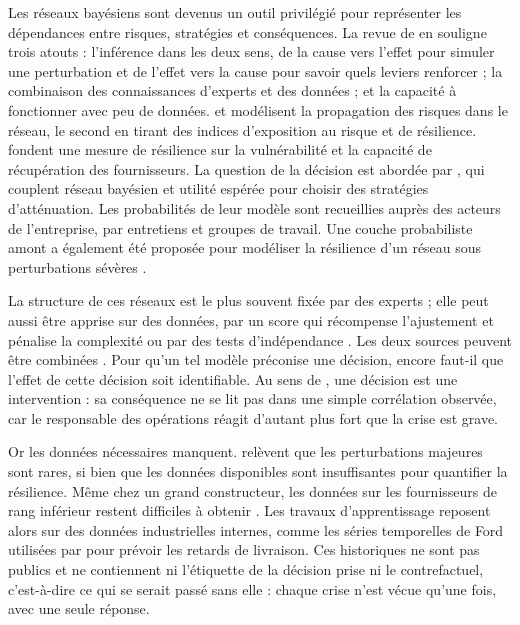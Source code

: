 Les réseaux bayésiens sont devenus un outil privilégié pour représenter les dépendances entre risques, stratégies et conséquences. La revue de \citet{hosseiniivanov2020} en souligne trois atouts : l'inférence dans les deux sens, de la cause vers l'effet pour simuler une perturbation et de l'effet vers la cause pour savoir quels leviers renforcer ; la combinaison des connaissances d'experts et des données ; et la capacité à fonctionner avec peu de données. \citet{garvey2015} et \citet{ojha2018} modélisent la propagation des risques dans le réseau, le second en tirant des indices d'exposition au risque et de résilience. \citet{hosseiniivanov2022aor} fondent une mesure de résilience sur la vulnérabilité et la capacité de récupération des fournisseurs. La question de la décision est abordée par \citet{qazi2018}, qui couplent réseau bayésien et utilité espérée pour choisir des stratégies d'atténuation. Les probabilités de leur modèle sont recueillies auprès des acteurs de l'entreprise, par entretiens et groupes de travail. Une couche probabiliste amont a également été proposée pour modéliser la résilience d'un réseau sous perturbations sévères \citep{rahiel2026codit}.

La structure de ces réseaux est le plus souvent fixée par des experts ; elle peut aussi être apprise sur des données, par un score qui récompense l'ajustement et pénalise la complexité ou par des tests d'indépendance \citep{koller2009, hosseiniivanov2020}. Les deux sources peuvent être combinées \citep{heckerman1995}. Pour qu'un tel modèle préconise une décision, encore faut-il que l'effet de cette décision soit identifiable. Au sens de \citet{pearl2009}, une décision est une intervention : sa conséquence ne se lit pas dans une simple corrélation observée, car le responsable des opérations réagit d'autant plus fort que la crise est grave.

Or les données nécessaires manquent. \citet{hosseiniivanov2020} relèvent que les perturbations majeures sont rares, si bien que les données disponibles sont insuffisantes pour quantifier la résilience. Même chez un grand constructeur, les données sur les fournisseurs de rang inférieur restent difficiles à obtenir \citep{simchilevi2015}. Les travaux d'apprentissage reposent alors sur des données industrielles internes, comme les séries temporelles de Ford utilisées par \citet{do2024} pour prévoir les retards de livraison. Ces historiques ne sont pas publics et ne contiennent ni l'étiquette de la décision prise ni le contrefactuel, c'est-à-dire ce qui se serait passé sans elle : chaque crise n'est vécue qu'une fois, avec une seule réponse.

